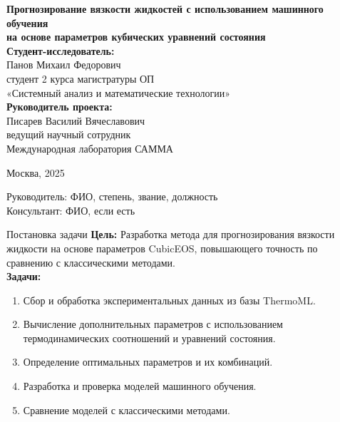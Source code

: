 \documentclass[aspectratio=169]{beamer}
\begin{document}
\begin{frame}
    \centering
    \vspace{1cm}
    {\Large\textbf{Прогнозирование вязкости жидкостей с использованием машинного обучения\\ на основе параметров кубических уравнений состояния}}\\[2cm]

    {\bfseries Студент-исследователь:}\\
    Панов Михаил Федорович\\
    студент 2 курса магистратуры ОП\\
    «Системный анализ и математические технологии»\\[1.5cm]

    {\bfseries Руководитель проекта:}\\
    Писарев Василий Вячеславович\\
    ведущий научный сотрудник\\
    Международная лаборатория САММА\\[1.5cm]

    \vfill
    \begin{flushright}
    Москва, 2025
    \end{flushright}
\end{frame}

\begin{frame}
    \titlepage
    \vfill
    \begin{flushright}
    Руководитель: ФИО, степень, звание, должность \\
    Консультант: ФИО, если есть
    \end{flushright}
\end{frame}

\begin{frame}{Постановка задачи}
    \textbf{Цель:} Разработка метода для прогнозирования вязкости жидкости на основе параметров CubicEOS, повышающего точность по сравнению с классическими методами.\\[1ex]
    \textbf{Задачи:}
    \begin{enumerate}
        \item Сбор и обработка экспериментальных данных из базы ThermoML.
        \item Вычисление дополнительных параметров с использованием термодинамических соотношений и уравнений состояния.
        \item Определение оптимальных параметров и их комбинаций.
        \item Разработка и проверка моделей машинного обучения.
        \item Сравнение моделей с классическими методами.
    \end{enumerate}
\end{frame}
\end{document}
